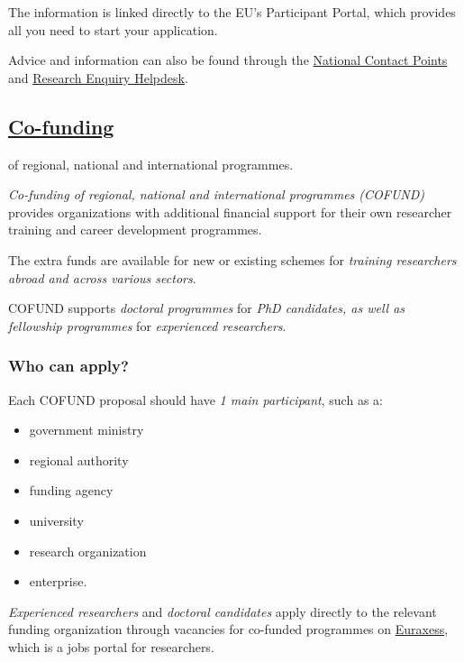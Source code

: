 \documentclass[oneside]{book}
\numberwithin{equation}{section}
\begin{document}
The information is linked directly to the EU's Participant Portal, which provides all you need to start your application.

%
Advice and information can also be found through the \href{http://ec.europa.eu/research/participants/portal/desktop/en/support/national_contact_points.html}{National Contact Points} and \href{http://ec.europa.eu/research/index.cfm?pg=enquiries}{Research Enquiry Helpdesk}.

\subsection{\href{https://ec.europa.eu/research/mariecurieactions/actions/co-funding-programmes_en}{Co-funding}}
\begin{center}
    of regional, national and international programmes.
\end{center}
\textit{Co-funding of regional, national and international programmes (COFUND)} provides organizations with additional financial support for their own researcher training and career development programmes.

%
The extra funds are available for new or existing schemes for \textit{training researchers abroad and across various sectors}.

%
COFUND supports \textit{doctoral programmes} for \textit{PhD candidates, as well as fellowship programmes} for \textit{experienced researchers}.

\subsubsection{Who can apply?}
Each COFUND proposal should have \textit{1 main participant}, such as a:
\begin{itemize}
    \item government ministry
    \item regional authority
    \item funding agency
    \item university
    \item research organization
    \item enterprise.    
\end{itemize}
\textit{Experienced researchers} and \textit{doctoral candidates} apply directly to the relevant funding organization through vacancies for co-funded programmes on \href{http://ec.europa.eu/euraxess/index.cfm/jobs/index}{Euraxess}, which is a jobs portal for researchers.
\end{document}
